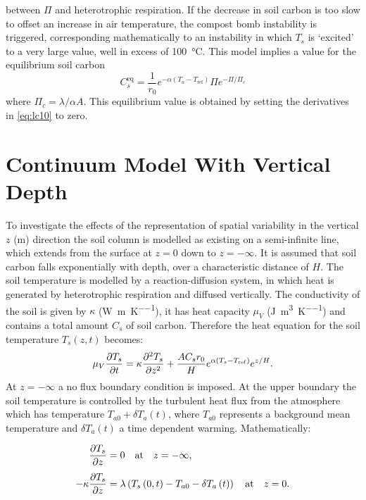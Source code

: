 between $\Pi$ and heterotrophic respiration.  
If the decrease in soil carbon is too slow to offset an increase in air temperature, the compost bomb instability is triggered, corresponding mathematically to an instability in which
$T_s$ is `excited' to a very large value, well in excess of \SI{100}{\degreeCelsius}. This model implies a value for the equilibrium soil carbon
\begin{equation}
  \label{eq:equilibrium_soil_carbon}
  C_s^{\mathrm{eq}} = \frac{1}{r_0}e^{-\alpha \left( T_a - T_{\mathrm{ref}}\right)} \Pi e^{-\Pi/\Pi_c}
\end{equation}
where $\Pi_c = \lambda /\alpha A$. This equilibrium value is obtained by setting the derivatives in \cref{eq:lc10} to zero.

\section{Continuum Model With Vertical Depth}
\label{sec:continuum_model}
To investigate the effects of the representation of spatial variability in the vertical $z$ (\si{\meter}) direction the soil column is
modelled as existing on a semi-infinite line, which extends from the surface at $z = 0$ down to $z = -\infty$. It is assumed that soil carbon
falls exponentially with depth, over a characteristic distance of $H$. The soil temperature is modelled by a reaction-diffusion system, in which heat is generated
by heterotrophic respiration and diffused vertically. The conductivity of the soil is given by $\kappa$ (\si{\watt\per\meter\per\kelvin})\cite{Best2005},
it has heat capacity $\mu_V$ (\si{\joule\per\cubic\meter\per\kelvin}) and contains a total amount $C_s$ of soil carbon. Therefore the heat equation
for the soil temperature $T_s(z,t)$ becomes:
\begin{equation}
  \label{eq:one_d_model}
  \mu_V \pdv{T_s}{t} = \kappa \pdv[2]{T_s}{z} + \frac{AC_sr_0}{H}e^{\alpha (T_s - T_{\mathrm{ref}})}e^{z/H}.
\end{equation}
At $z=-\infty$ a no flux boundary condition is imposed.
At the upper boundary the soil temperature is controlled by the turbulent heat flux from the atmosphere which has temperature
$T_{a0} + \delta T_a(t)$, where $T_{a0}$ represents a background mean temperature and $\delta T_a(t)$ a time dependent warming. Mathematically:

\begin{subequations}
  \label{eq:dimensional_bcs_nonuniform}
  \begin{align}
  \pdv{T_s}{z} &= 0 \quad \mathrm{at} \quad z = -\infty,\label{subeq:dimensional_bcs_nonuniform_lower} \\[1ex] 
  - \kappa\pdv{T_s}{z} &=   \lambda\left(T_s\left(0,t\right) - T_{a0} - \delta T_a\left(t\right)\right) \quad \mathrm{at}\quad z = 0.\label{subeq:dimensional_bcs_nonuniform_upper}
  \end{align}
\end{subequations}

